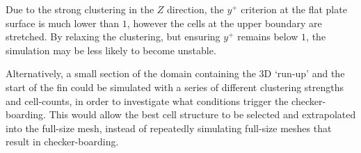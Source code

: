 Due to the strong clustering in the $Z$ direction, the $y^+$ criterion at the flat plate surface is much lower than $1$, however the cells at the upper boundary are stretched. By relaxing the clustering, but ensuring $y^+$ remains below $1$, the simulation may be less likely to become unstable. 

Alternatively, a small section of the domain containing the 3D `run-up' and the start of the fin could be simulated with a series of different clustering strengths and cell-counts, in order to investigate what conditions trigger the checker-boarding. This would allow the best cell structure to be selected and extrapolated into the full-size mesh, instead of repeatedly simulating full-size meshes that result in checker-boarding.